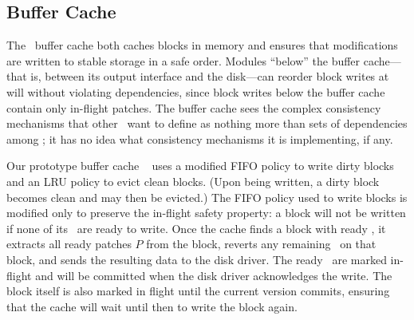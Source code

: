 
\subsection{Buffer Cache}
\label{sec:modules:wbcache}

The \Kudos\ buffer cache both
%
caches blocks in memory and
ensures that modifications are written to stable storage in a safe order.
%
Modules ``below'' the buffer cache---that is, between its output interface
and the disk---can reorder block writes at will without violating
dependencies, since block writes below the buffer cache contain only
in-flight patches.
%
%
The buffer cache sees the complex
consistency mechanisms that other \modules\ want to define as nothing more
than sets of dependencies among \patches; it has no idea what consistency
mechanisms it is implementing, if any.

Our prototype buffer cache \module\ 
%
uses a modified FIFO policy to write dirty blocks and an LRU policy to
evict clean blocks.  (Upon being written, a dirty block becomes clean and
may then be evicted.)
%
The FIFO policy used to write blocks is modified only to preserve the
in-flight safety property: a block will not be written if none of its
\patches\ are ready to write.
%
Once the cache finds a block with ready \patches, it extracts all ready
patches $P$ from the block, reverts any remaining \patches\ on that block,
and sends the resulting data to the disk driver.  The ready \patches\ are
marked in-flight and will be committed when the disk driver acknowledges
the write.
%
The block itself is also marked in flight until the current version
commits, ensuring that the cache will wait until then to write the block
again.


